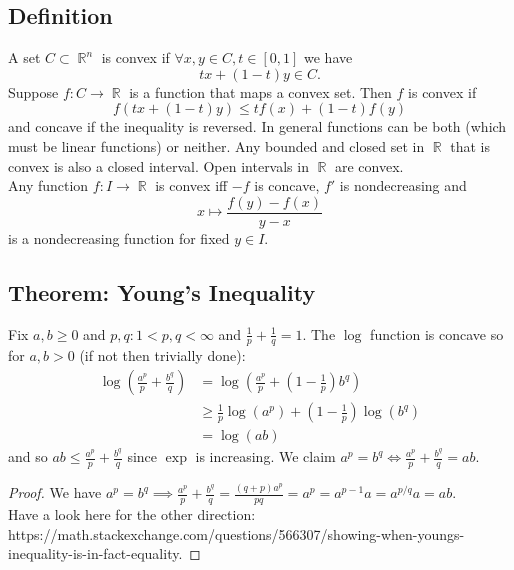 \documentclass{article}
\DeclareMathOperator\R{\mathbb{R}}
\begin{document}
\subsection*{Definition}
A set $C \subset \R^n$ is convex if $\forall x,y \in C, t \in [0,1]$ we have $$
tx+(1-t)y \in C. $$
Suppose $f:C \to \R$ is a function that maps a convex set. Then $f$ is convex if
$$
f(tx+(1-t)y) \leq tf(x) + (1-t)f(y)
$$
and concave if the inequality is reversed. In general functions can be both (which must be linear functions) or neither.
Any bounded and closed set in $\R$ that is convex is also a closed interval.
Open intervals in $\R$ are convex. \\ \newline Any function $f: I \to \R$ is convex iff $-f$ is concave, $f'$ is nondecreasing and $$
x \mapsto \frac{f(y) - f(x)}{y-x}
$$
is a nondecreasing function for fixed $y \in I$.
\subsection*{Theorem: Young's Inequality}
Fix $a,b \geq 0$ and $p,q: 1 < p,q < \infty$ and $\frac{1}{p}+\frac{1}{q} = 1$.
The $\log$ function is concave so for $a,b >0$ (if not then trivially done):
\begin{align*}
\log \left( \frac{a^p}{p}+\frac{b^q}{q} \right) &= \log \left( \frac{a^p}{p}+\left(1-\frac{1}{p} \right) b^q \right) \\
&\geq \frac{1}{p} \log \left( a^p \right) + \left(1-\frac{1}{p} \right) \log \left( b^q \right) \\
&= \log(ab)
\end{align*}
and so $ab \leq \frac{a^p}{p}+\frac{b^q}{q}$ since $\exp$ is increasing. We claim $a^p = b^q \iff \frac{a^p}{p}+\frac{b^q}{q} = ab$.
\begin{proof}
We have $a^p = b^q \implies \frac{a^p}{p}+\frac{b^q}{q} = \frac{(q+p)a^p}{pq} = a^p = a^{p-1}a = a^{p \slash q}a = ab$.
\\ \newline
Have a look here for the other direction: https://math.stackexchange.com/questions/566307/showing-when-youngs-inequality-is-in-fact-equality.
\end{proof}
\end{document}
